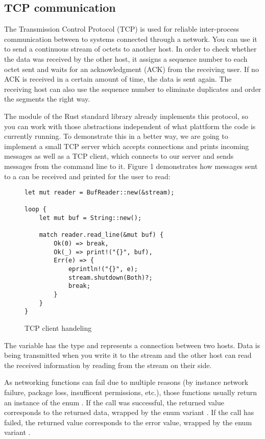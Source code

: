 \subsection{TCP communication}
The Transmission Control Protocol (TCP) is used for reliable inter-process communication between to systems connected
through a network. You can use it to send a continuous stream of octets to another host. In order to check whether the
data was received by the other host, it assigns a sequence number to each octet sent and waits for an acknowledgment
(ACK) from the receiving user. If no ACK is received in a certain amount of time, the data is sent again. The receiving
host can also use the sequence number to eliminate duplicates and order the segments the right way. \cite{RFC0793}

The module  of the Rust standard library already implements this protocol, so you can work with those
abstractions independent of what plattform the code is currently running. To demonstrate this in a better way, we are
going to implement a small TCP server which accepts connections and prints incoming messages as well as a TCP client,
which connects to our server and sends messages from the command line to it. Figure 1 demonstrates how messages sent to
a  can be received and printed for the user to read:

\begin{figure}[ht]
    \begin{verbatim}
let mut reader = BufReader::new(&stream);

loop {
    let mut buf = String::new();

    match reader.read_line(&mut buf) {
        Ok(0) => break,
        Ok(_) => print!("{}", buf),
        Err(e) => {
            eprintln!("{}", e);
            stream.shutdown(Both)?;
            break;
        }
    }
}
    \end{verbatim}
    \caption{TCP client handeling}
\end{figure}

The variable  has the type  and represents a connection between two hosts. Data is being
transmitted when you write it to the stream and the other host can read the received information by reading from the
stream on their side.

As networking functions can fail due to multiple reasons (by instance network failure, package loss, insufficent
permissions, etc.), those functions usually return an instance of the enum . If the call was
successful, the returned value corresponds to the returned data, wrapped by the enum variant . If the call
has failed, the returned value corresponds to the error value, wrapped by the enum variant .

